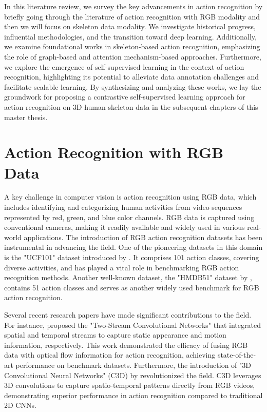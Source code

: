 In this literature review, we survey the key advancements in action recognition by briefly going through the literature of action recognition with RGB modality and then we will focus on skeleton data modality. We investigate historical progress, influential methodologies, and the transition toward deep learning. Additionally, we examine foundational works in skeleton-based action recognition, emphasizing the role of graph-based and attention mechanism-based approaches. Furthermore, we explore the emergence of self-supervised learning in the context of action recognition, highlighting its potential to alleviate data annotation challenges and facilitate scalable learning. By synthesizing and analyzing these works, we lay the groundwork for proposing a contrastive self-supervised learning approach for action recognition on 3D human skeleton data in the subsequent chapters of this master thesis.

\section{Action Recognition with RGB Data}
A key challenge in computer vision is action recognition using RGB data, which includes identifying and categorizing human activities from video sequences represented by red, green, and blue color channels. RGB data is captured using conventional cameras, making it readily available and widely used in various real-world applications. The introduction of RGB action recognition datasets has been instrumental in advancing the field. One of the pioneering datasets in this domain is the "UCF101" dataset introduced by \cite{soomro2012ucf101}. It comprises 101 action classes, covering diverse activities, and has played a vital role in benchmarking RGB action recognition methods. Another well-known dataset, the "HMDB51" dataset by \cite{kuehne2011hmdb}, contains 51 action classes and serves as another widely used benchmark for RGB action recognition.


Several recent research papers have made significant contributions to the field. For instance, \cite{tran2015learning} proposed the "Two-Stream Convolutional Networks" that integrated spatial and temporal streams to capture static appearance and motion information, respectively. This work demonstrated the efficacy of fusing RGB data with optical flow information for action recognition, achieving state-of-the-art performance on benchmark datasets. Furthermore, the introduction of "3D Convolutional Neural Networks" (C3D) by \cite{ji20123d} revolutionized the field. C3D leverages 3D convolutions to capture spatio-temporal patterns directly from RGB videos, demonstrating superior performance in action recognition compared to traditional 2D CNNs.


